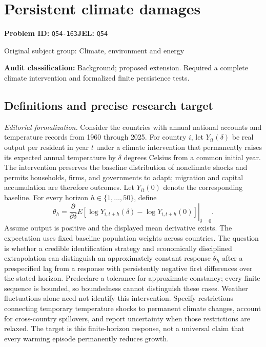\documentclass[11pt,a4paper]{article}
\begin{document}
\section*{Persistent climate damages}
\textbf{Problem ID:} \texttt{Q54-163}\quad \textbf{JEL:} \texttt{Q54}\par
\label{problem:OP-0430}
{\sffamily\small\color{muted}Original subject group: Climate, environment and energy\par}
\label{definitions:problem:30007712}
\textbf{Audit classification:} Background; proposed extension. Required a complete climate intervention and formalized finite persistence tests.
\subsection*{Definitions and precise research target}
\textit{Editorial formalization.} Consider the countries with annual national accounts and temperature records from 1960 through 2025. For country \(i\), let \(Y_{it}(\delta)\) be real output per resident in year \(t\) under a climate intervention that permanently raises its expected annual temperature by \(\delta\) degrees Celsius from a common initial year. The intervention preserves the baseline distribution of nonclimate shocks and permits households, firms, and governments to adapt; migration and capital accumulation are therefore outcomes. Let \(Y_{it}(0)\) denote the corresponding baseline. For every horizon \(h\in\{1,\ldots,50\}\), define
\[\theta_h=\left.\frac{\partial}{\partial\delta}E[\log Y_{i,t+h}(\delta)-\log Y_{i,t+h}(0)]\right|_{\delta=0}.\]
Assume output is positive and the displayed mean derivative exists. The expectation uses fixed baseline population weights across countries. The question is whether a credible identification strategy and economically disciplined extrapolation can distinguish an approximately constant response \(\theta_h\) after a prespecified lag from a response with persistently negative first differences over the stated horizon. Predeclare a tolerance for approximate constancy; every finite sequence is bounded, so boundedness cannot distinguish these cases. Weather fluctuations alone need not identify this intervention. Specify restrictions connecting temporary temperature shocks to permanent climate changes, account for cross-country spillovers, and report uncertainty when those restrictions are relaxed. The target is this finite-horizon response, not a universal claim that every warming episode permanently reduces growth.
\end{document}
